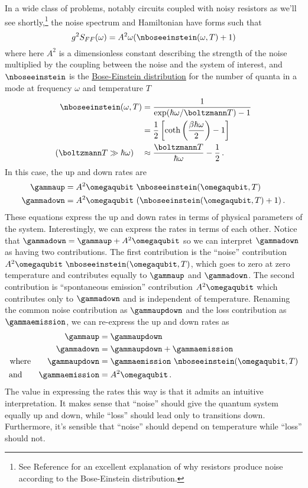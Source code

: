 In a wide class of problems, notably circuits coupled with noisy resistors as we'll see shortly,\footnote{See Reference \cite{Nyquist:noise:1928} for an excellent explanation of why resistors produce noise according to the Bose-Einstein distribution.} the noise spectrum and Hamiltonian have forms such that
\begin{equation}
  g^2 S_{FF}(\omega) = A^2 \omega (\nboseeinstein(\omega, T) + 1) \label{eq:noise_standard_form}
\end{equation}
where here $A^2$ is a dimensionless constant describing the strength of the noise multiplied by the coupling between the noise and the system of interest, and $\nboseeinstein$ is the \href{https://en.wikipedia.org/wiki/Bose\%E2\%80\%93Einstein_statistics}{Bose-Einstein distribution} for the number of quanta in a mode at frequency $\omega$ and temperature $T$
\begin{align}
  \nboseeinstein(\omega, T)
  &= \frac{1}{\exp(\hbar \omega / \boltzmann T) - 1} \\
  & = \frac{1}{2} \left[ \coth \left( \frac{\beta \hbar \omega}{2} \right) - 1 \right] \\
  (\boltzmann T \gg \hbar \omega) \quad & \approx \frac{\boltzmann T}{\hbar \omega} - \frac{1}{2}
  \, .
\end{align}
In this case, the up and down rates are
\begin{align}
    \gammaup & = A^2 \omegaqubit ~ \nboseeinstein(\omegaqubit, T) \\
    \gammadown &= A^2 \omegaqubit ~ (\nboseeinstein(\omegaqubit, T) + 1)
    \, .
\end{align}
These equations express the up and down rates in terms of physical parameters of the system.
Interestingly, we can express the rates in terms of each other.
Notice that $\gammadown = \gammaup + A^2 \omegaqubit$ so we can interpret $\gammadown$ as having two contributions.
The first contribution is the ``noise'' contribution $A^2 \omegaqubit ~ \nboseeinstein(\omegaqubit, T)$, which goes to zero at zero temperature and contributes equally to $\gammaup$ and $\gammadown$.
The second contribution is ``spontaneous emission'' contribution $A^2 \omegaqubit$ which contributes only to $\gammadown$ and is independent of temperature.
Renaming the common noise contribution as $\gammaupdown$ and the loss contribution as $\gammaemission$, we can re-express the up and down rates as
\begin{align}
  \gammaup &= \gammaupdown \\
  \gammadown &= \gammaupdown + \gammaemission \\
  \text{where} \qquad
  \gammaupdown &= \gammaemission ~ \nboseeinstein(\omegaqubit, T) \label{eq:fluctuation_dissipation} \\
  \text{and} \qquad
  \gammaemission &= A^2 \omegaqubit
  \, .
\end{align}
The value in expressing the rates this way is that it admits an intuitive interpretation.
It makes sense that ``noise'' should give the quantum system equally up and down, while ``loss'' should lead only to transitions down.
Furthermore, it's sensible that ``noise'' should depend on temperature while ``loss'' should not.

